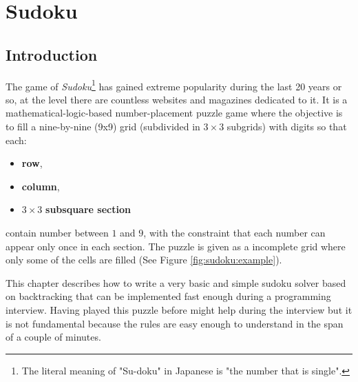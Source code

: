 %

\chapter{Sudoku}
\label{ch:sudoku}
\section*{Introduction}
The game of \textit{Sudoku}\footnote{The literal meaning of "Su-doku" in Japanese is "the number
that is single".} has gained extreme popularity during the last 20 years or so, at the level there
are countless websites and magazines dedicated to it. It is a mathematical-logic-based
number-placement puzzle game where the objective is to fill a nine-by-nine (9x9) grid (subdivided in
$3\times3$ subgrids) with digits so that each:
\begin{itemize}[a)]
	\item \textbf{row},
	\item \textbf{column},
	\item $3\times3$ \textbf{subsquare section}
\end{itemize}
contain number between $1$ and $9$, with the constraint that each number can appear only once in
each section. The puzzle is given as a incomplete grid where only some of the cells are filled (See
Figure \ref{fig:sudoku:example}).

This chapter describes how to write a very basic and simple sudoku
solver based on backtracking that can be implemented fast enough during a programming interview.
Having played this puzzle before might help during the interview but it is not fundamental because
the rules are easy enough to understand in the span of a couple of minutes.

